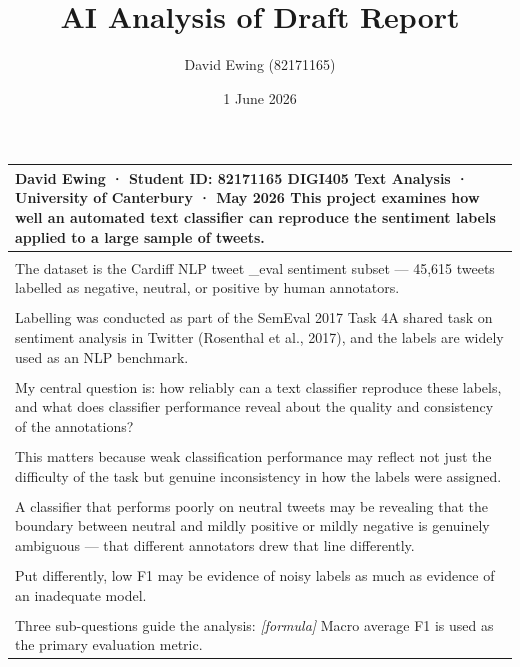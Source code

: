 \documentclass[11pt]{article}
\title{AI Analysis of Draft Report}
\author{David Ewing (82171165)}
\date{1 June 2026}
\begin{document}
\maketitle
\thispagestyle{empty}
\newpage

\begin{longtable}{|p{\dimexpr\linewidth-2\tabcolsep-2\arrayrulewidth\relax}|}
\hline
David Ewing · Student ID: 82171165 DIGI405 Text Analysis · University of Canterbury · May 2026 This project examines how well an automated text classifier can reproduce the sentiment labels applied to a large sample of tweets. \\[2pt]
\hline
\rule{0pt}{3.5cm} \\
\hline
The dataset is the Cardiff NLP tweet \_eval sentiment subset --- 45,615 tweets labelled as negative, neutral, or positive by human annotators. \\[2pt]
\hline
\rule{0pt}{3.5cm} \\
\hline
Labelling was conducted as part of the SemEval 2017 Task 4A shared task on sentiment analysis in Twitter (Rosenthal et al., 2017), and the labels are widely used as an NLP benchmark. \\[2pt]
\hline
\rule{0pt}{3.5cm} \\
\hline
My central question is: how reliably can a text classifier reproduce these labels, and what does classifier performance reveal about the quality and consistency of the annotations? \\[2pt]
\hline
\rule{0pt}{3.5cm} \\
\hline
This matters because weak classification performance may reflect not just the difficulty of the task but genuine inconsistency in how the labels were assigned. \\[2pt]
\hline
\rule{0pt}{3.5cm} \\
\hline
A classifier that performs poorly on neutral tweets may be revealing that the boundary between neutral and mildly positive or mildly negative is genuinely ambiguous --- that different annotators drew that line differently. \\[2pt]
\hline
\rule{0pt}{3.5cm} \\
\hline
Put differently, low F1 may be evidence of noisy labels as much as evidence of an inadequate model. \\[2pt]
\hline
\rule{0pt}{3.5cm} \\
\hline
Three sub-questions guide the analysis: \textit{[formula]} Macro average F1 is used as the primary evaluation metric. \\[2pt]

\end{longtable}
\end{document}
